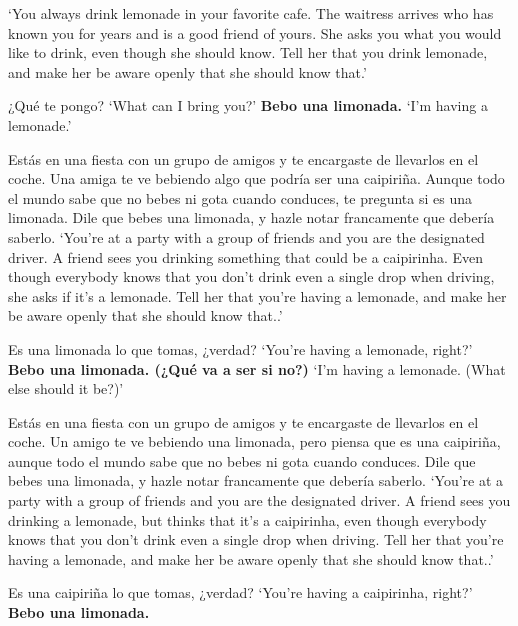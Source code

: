 \begin{exe}
	\glt `You always drink lemonade in your favorite cafe. The waitress arrives who has known you for years and is a good friend of yours. She asks you what you would like to drink, even though she should know. Tell her that you drink lemonade, and make her be aware openly that she should know that.' 
	\begin{xlist}[A:]
	 ¿Qué te pongo? \href{https://osf.io/vf4m2/}{\faVolumeUp}
	\glt `What can I bring you?' 
	 \textbf{Bebo una limonada.} 
	\glt `I'm having a lemonade.' 
	\end{xlist}
\ex \label{ex:experimentoOBVCONFlimonada_APP}
	Estás en una fiesta con un grupo de amigos y te encargaste de llevarlos en el coche. Una amiga te ve bebiendo algo que podría ser una caipiriña. Aunque todo el mundo sabe que no bebes ni gota cuando conduces, te pregunta si es una limonada. Dile que bebes una limonada, y hazle notar francamente que debería saberlo. 
	\glt `You're at a party with a group of friends and you are the designated driver. A friend sees you drinking something that could be a caipirinha. Even though everybody knows that you don't drink even a single drop when driving, she asks if it's a lemonade. Tell her that you're having a lemonade, and make her be aware openly that she should know that..' 
	\begin{xlist}[A:]
	 Es una limonada lo que tomas, ¿verdad? \href{https://osf.io/m6q4j/}{\faVolumeUp}
	\glt `You're having a lemonade, right?' 
	 \textbf{Bebo una limonada. (¿Qué va a ser si no?)} 
	\glt `I'm having a lemonade. (What else should it be?)' 
	\end{xlist}
\largerpage
\ex \label{ex:experimentoOBVDENlimonada_APP}
	Estás en una fiesta con un grupo de amigos y te encargaste de llevarlos en el coche. Un amigo te ve bebiendo una limonada, pero piensa que es una caipiriña, aunque todo el mundo sabe que no bebes ni gota cuando conduces. Dile que bebes una limonada, y hazle notar francamente que debería saberlo. 
	\pagebreak\glt `You're at a party with a group of friends and you are the designated driver. A friend sees you drinking a lemonade, but thinks that it's a caipirinha, even though everybody knows that you don't drink even a single drop when driving. Tell her that you're having a lemonade, and make her be aware openly that she should know that..' 
	\begin{xlist}[A:]
	 Es una caipiriña lo que tomas, ¿verdad? \href{https://osf.io/6te3x/}{\faVolumeUp}
	\glt `You're having a caipirinha, right?' 
	 \textbf{Bebo una limonada.} 

\end{xlist}
\end{exe}
